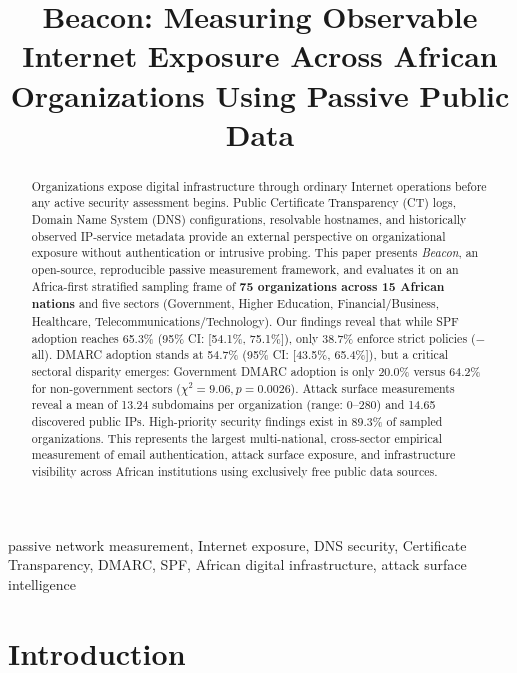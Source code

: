 \documentclass[conference]{IEEEtran}
\begin{document}
\title{Beacon: Measuring Observable Internet Exposure Across African Organizations Using Passive Public Data}

\author{
}

\maketitle

\begin{abstract}
Organizations expose digital infrastructure through ordinary Internet operations before any active security assessment begins. Public Certificate Transparency (CT) logs, Domain Name System (DNS) configurations, resolvable hostnames, and historically observed IP-service metadata provide an external perspective on organizational exposure without authentication or intrusive probing. This paper presents \textit{Beacon}, an open-source, reproducible passive measurement framework, and evaluates it on an Africa-first stratified sampling frame of \textbf{75 organizations across 15 African nations} and five sectors (Government, Higher Education, Financial/Business, Healthcare, Telecommunications/Technology). Our findings reveal that while SPF adoption reaches 65.3\% (95\% CI: [54.1\%, 75.1\%]), only 38.7\% enforce strict policies ($-$all). DMARC adoption stands at 54.7\% (95\% CI: [43.5\%, 65.4\%]), but a critical sectoral disparity emerges: Government DMARC adoption is only 20.0\% versus 64.2\% for non-government sectors ($\chi^2 = 9.06, p = 0.0026$). Attack surface measurements reveal a mean of 13.24 subdomains per organization (range: 0--280) and 14.65 discovered public IPs. High-priority security findings exist in 89.3\% of sampled organizations. This represents the largest multi-national, cross-sector empirical measurement of email authentication, attack surface exposure, and infrastructure visibility across African institutions using exclusively free public data sources.
\end{abstract}

\begin{IEEEkeywords}
passive network measurement, Internet exposure, DNS security, Certificate Transparency, DMARC, SPF, African digital infrastructure, attack surface intelligence
\end{IEEEkeywords}

\section{Introduction}
\end{document}
